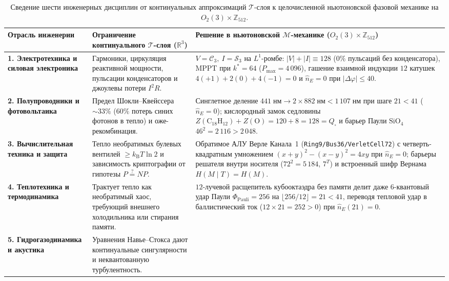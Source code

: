 \documentclass[11pt,a4paper]{article}
\theoremstyle{definition}
\theoremstyle{remark}
\begin{document}
\begin{table}[htbp]
\centering
\caption{Сведение шести инженерных дисциплин от континуальных аппроксимаций $\mathcal{T}$-слоя к целочисленной ньютоновской фазовой механике на $O_2(3)\times\mathbb{Z}_{512}$.}
\label{tab:engineering-homeomorphism}
\footnotesize
\begin{tabular}{@{}p{}p{}p{}@{}}
\toprule
\textbf{Отрасль инженерии} & \textbf{Ограничение континуального $\mathcal{T}$-слоя ($\mathbb{R}^3$)} & \textbf{Решение в ньютоновской $\mathcal{M}$-механике ($O_2(3)\times\mathbb{Z}_{512}$)} \\
\midrule
\textbf{1. Электротехника и силовая электроника} &
Гармоники, циркуляция реактивной мощности, пульсации конденсаторов и джоулевы потери $I^2 R$. &
$V=\mathcal{C}_3,\ I=\mathcal{S}_3$ на $L^1$-ромбе: $|V|+|I|\equiv 128$ ($0\%$ пульсаций без конденсатора), MPPT при $k^*=64$ ($P_{\max}=4\,096$), гашение взаимной индукции $12$ катушек $4(+1)+2(0)+4(-1)=0$ и $\hat{n}_E=0$ при $|\Delta\varphi|\le 40$. \\
\addlinespace[3pt]
\textbf{2. Полупроводники и фотовольтаика} &
Предел Шокли--Квейссера $\sim 33\%$ ($60\%$ потерь синих фотонов в тепло) и оже-рекомбинация. &
Синглетное деление $441\;\text{нм}\to 2\times 882\;\text{нм} < 1\,107\;\text{нм}$ при шаге $21 < 41$ ($\hat{n}_E=0$); кислородный замок седловины $Z(\mathrm{C_{18}H_{12}})+Z(\mathrm{O})=120+8=128=Q_\square$ и барьер Паули $\mathrm{SiO}_4$ $46^2=2\,116>2\,048$. \\
\addlinespace[3pt]
\textbf{3. Вычислительная техника и защита} &
Тепло необратимых булевых вентилей $\ge k_{\mathrm{B}}T\ln 2$ и зависимость криптографии от гипотезы $P\stackrel{?}{=}NP$. &
Обратимое АЛУ Верле Канала~1 (\texttt{Ring9/Bus36/VerletCell72}) с четверть-квадратным умножением $(x+y)^2-(x-y)^2=4xy$ при $\hat{n}_E=0$; барьеры решателя внутри носителя ($72^2=5\,184$, $7^T$) и встроенный шифр Вернама $H(M\mid T)=H(M)$. \\
\addlinespace[3pt]
\textbf{4. Теплотехника и термодинамика} &
Трактует тепло как необратимый хаос, требующий внешнего холодильника или стирания памяти. &
$12$-лучевой расщепитель кубооктаэдра без памяти делит даже $6$-квантовый удар Паули $\Phi_{\mathrm{Pauli}}=256$ на $\lfloor 256/12\rfloor = 21 < 41$, переводя тепловой удар в баллистический ток ($12\times 21=252>0$) при $\hat{n}_E(21)=0$. \\
\addlinespace[3pt]
\textbf{5. Гидрогазодинамика и акустика} &
Уравнения Навье--Стокса дают континуальные сингулярности и неквантованную турбулентность. &

\end{tabular}
\end{table}
\end{document}
